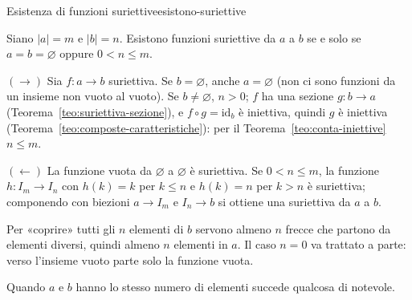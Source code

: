 \begin{concetto}
\begin{Proposizione}{Esistenza di funzioni suriettive}{esistono-suriettive}
    \begin{prerequisiti}
    \end{prerequisiti}
    Siano $|a| = m$ e $|b| = n$. Esistono funzioni suriettive da $a$ a $b$ se e solo se $a = b = \varnothing$ oppure $0 < n \leq m$.
\end{Proposizione}
\begin{dimostrazione}
    \begin{caso}{$(\rightarrow)$}
        Sia $f \colon a \to b$ suriettiva. Se $b = \varnothing$, anche $a = \varnothing$ (non ci sono funzioni da un insieme non vuoto al vuoto).
        Se $b \neq \varnothing$, $n > 0$; $f$ ha una sezione $g \colon b \to a$ (Teorema~\ref{teo:suriettiva-sezione}), e $f \circ g = \mathrm{id}_b$ è iniettiva,
        quindi $g$ è iniettiva (Teorema~\ref{teo:composte-caratteristiche}): per il Teorema~\ref{teo:conta-iniettive} $n \leq m$.
    \end{caso}
    \begin{caso}{$(\leftarrow)$}
        La funzione vuota da $\varnothing$ a $\varnothing$ è suriettiva. Se $0 < n \leq m$, la funzione $h \colon I_m \to I_n$ con $h(k) = k$ per $k \leq n$ e
        $h(k) = n$ per $k > n$ è suriettiva; componendo con biezioni $a \to I_m$ e $I_n \to b$ si ottiene una suriettiva da $a$ a $b$.
    \end{caso}
\end{dimostrazione}
\end{concetto}

\begin{spiegazione}
    Per «coprire» tutti gli $n$ elementi di $b$ servono almeno $n$ frecce che partono da elementi diversi, quindi almeno $n$
    elementi in $a$. Il caso $n = 0$ va trattato a parte: verso l'insieme vuoto parte solo la funzione vuota.
\end{spiegazione}

Quando $a$ e $b$ hanno lo stesso numero di elementi succede qualcosa di notevole.

